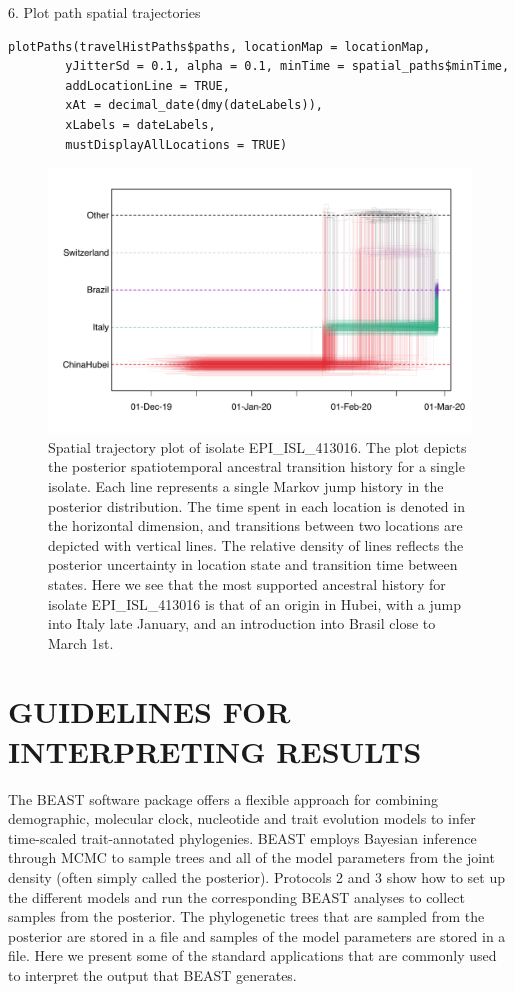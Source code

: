 \documentclass{article}
\newcommand{\code}[1]{
{\upshape\ttfamily{#1}}}
\begin{document}
6. Plot path spatial trajectories
\begin{verbatim}
plotPaths(travelHistPaths$paths, locationMap = locationMap,
        yJitterSd = 0.1, alpha = 0.1, minTime = spatial_paths$minTime,
        addLocationLine = TRUE,
        xAt = decimal_date(dmy(dateLabels)),
        xLabels = dateLabels,
        mustDisplayAllLocations = TRUE)
\end{verbatim}

\begin{figure}[!ht]
    \centering
    \includegraphics[width=1.0\textwidth]{figs/travel_trajectory.pdf}
    \caption{Spatial trajectory plot of isolate EPI\_ISL\_413016. The plot depicts the posterior spatiotemporal ancestral transition history for a single isolate. Each line represents a single Markov jump history in the posterior distribution. The time spent in each location is denoted in the horizontal dimension, and transitions between two locations are depicted with vertical lines. The relative density of lines reflects the posterior uncertainty in location state and transition time between states. Here we see that the most supported ancestral history for isolate EPI\_ISL\_413016 is that of an origin in Hubei, with a jump into Italy late January, and an introduction into Brasil close to March 1st.}
    \label{fig:trajectory}
\end{figure}


\section*{GUIDELINES FOR INTERPRETING RESULTS}

The BEAST software package offers a flexible approach for combining demographic, molecular clock, nucleotide and trait evolution models to infer time-scaled trait-annotated phylogenies.
BEAST employs Bayesian inference through MCMC to sample trees and all of the model parameters from the joint density (often simply called the posterior).
Protocols 2 and 3 show how to set up the different models and run the corresponding BEAST analyses to collect samples from the posterior.
The phylogenetic trees that are sampled from the posterior are stored in a\code{.trees} file and samples of the model parameters are stored in a\code{.log} file.
Here we present some of the standard applications that are commonly used to interpret the output that BEAST generates.
\end{document}
